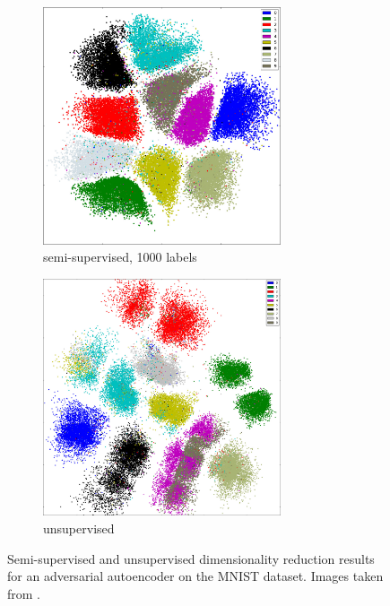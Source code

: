 \begin{figure}[ht]
    \centering
    \begin{subfigure}{72.5mm}
        \raggedright
        \includegraphics[width=70mm]{../img/aae-clustering-semi.png}
        \caption{semi-supervised, 1000 labels}
    \end{subfigure}%
    \begin{subfigure}{72.5mm}
        \raggedleft
        \includegraphics[width=70mm]{../img/aae-clustering-unsup.png}
        \caption{unsupervised}
    \end{subfigure}
    \caption{Semi-supervised and unsupervised dimensionality reduction results for an adversarial autoencoder on the MNIST dataset. Images taken from \cite{AdversarialAutoencoders}.}
    \label{fig:test}
\end{figure}

